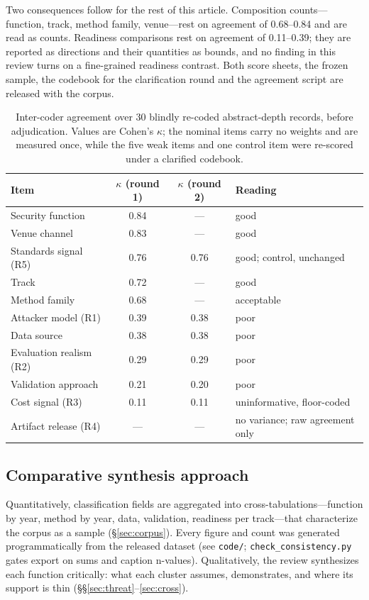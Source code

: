 \documentclass[10.5pt,compsoc,winfonts]{ICN}
\begin{document}
Two consequences follow for the rest of this article. Composition counts—function, track, method
family, venue—rest on agreement of 0.68–0.84 and are read as counts. Readiness comparisons rest
on agreement of 0.11–0.39; they are reported as directions and their quantities as bounds, and no
finding in this review turns on a fine-grained readiness contrast. Both score sheets, the frozen
sample, the codebook for the clarification round and the agreement script are released with the
corpus.

\begin{table}[tbp]
\centering
\footnotesize
\caption{Inter-coder agreement over 30 blindly re-coded abstract-depth records, before
adjudication. Values are Cohen's $\kappa$; the nominal items carry no weights and are measured
once, while the five weak items and one control item were re-scored under a clarified codebook.}
\label{tab:reliability}
\begin{tabular}{@{}lcc l@{}}
\toprule
Item & $\kappa$ (round 1) & $\kappa$ (round 2) & Reading \\
\midrule
Security function      & 0.84 & —  & good \\
Venue channel          & 0.83 & —  & good \\
Standards signal (R5)  & 0.76 & 0.76 & good; control, unchanged \\
Track                  & 0.72 & —  & good \\
Method family          & 0.68 & —  & acceptable \\
Attacker model (R1)    & 0.39 & 0.38 & poor \\
Data source            & 0.38 & 0.38 & poor \\
Evaluation realism (R2)& 0.29 & 0.29 & poor \\
Validation approach    & 0.21 & 0.20 & poor \\
Cost signal (R3)       & 0.11 & 0.11 & uninformative, floor-coded \\
Artifact release (R4)  & —  & —  & no variance; raw agreement only \\
\bottomrule
\end{tabular}
\end{table}

\subsection{Comparative synthesis approach}
Quantitatively, classification fields are aggregated into cross-tabulations—function by year, method by year, data, validation, readiness per track—that characterize the corpus as a sample (\S\ref{sec:corpus}). Every figure and count was generated programmatically from the released dataset (see \texttt{code/}; \texttt{check\_consistency.py} gates export on sums and caption n-values). Qualitatively, the review synthesizes each function critically: what each cluster assumes, demonstrates, and where its support is thin (\S\S\ref{sec:threat}–\ref{sec:cross}).
\end{document}
